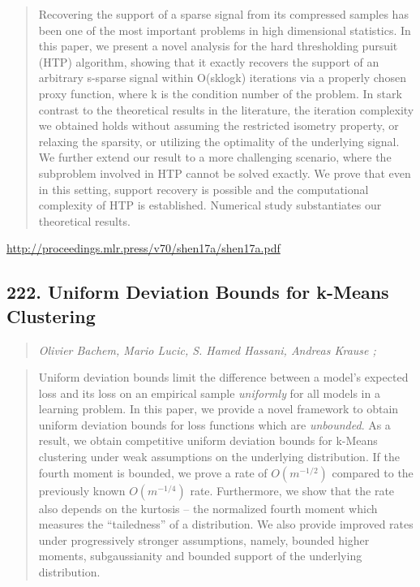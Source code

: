 \documentclass{article}
\begin{document}
\begin{quote}
    Recovering the support of a sparse signal from its compressed samples has been one of the most important problems in high dimensional statistics. In this paper, we present a novel analysis for the hard thresholding pursuit (HTP) algorithm, showing that it exactly recovers the support of an arbitrary s-sparse signal within O(sklogk) iterations via a properly chosen proxy function, where k is the condition number of the problem. In stark contrast to the theoretical results in the literature, the iteration complexity we obtained holds without assuming the restricted isometry property, or relaxing the sparsity, or utilizing the optimality of the underlying signal. We further extend our result to a more challenging scenario, where the subproblem involved in HTP cannot be solved exactly. We prove that even in this setting, support recovery is possible and the computational complexity of HTP is established. Numerical study substantiates our theoretical results.  
\end{quote}

\href{http://proceedings.mlr.press/v70/shen17a/shen17a.pdf}{http://proceedings.mlr.press/v70/shen17a/shen17a.pdf}

\subsection{222. Uniform Deviation Bounds for k-Means Clustering}

\begin{quote}
\footnotesize{\textit{Olivier Bachem, Mario Lucic, S. Hamed Hassani, Andreas Krause ;}}

\end{quote}

\begin{quote}
    Uniform deviation bounds limit the difference between a model’s expected loss and its loss on an empirical sample \textit{uniformly} for all models in a learning problem. In this paper, we provide a novel framework to obtain uniform deviation bounds for loss functions which are \textit{unbounded}. As a result, we obtain competitive uniform deviation bounds for k-Means clustering under weak assumptions on the underlying distribution. If the fourth moment is bounded, we prove a rate of $O(m^{-1/2})$ compared to the previously known $O(m^{-1/4})$ rate. Furthermore, we show that the rate also depends on the kurtosis – the normalized fourth moment which measures the “tailedness” of a distribution. We also provide improved rates under progressively stronger assumptions, namely, bounded higher moments, subgaussianity and bounded support of the underlying distribution.  
\end{quote}
\end{document}
